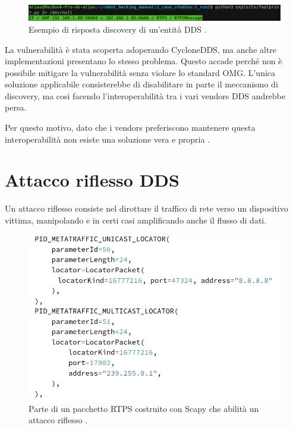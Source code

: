 \begin{figure}[H]
    \centering
    \includegraphics[width=15.2cm, keepaspectratio]{img/rispostarecoinnassance.png}
    \caption{Esempio di risposta discovery di un'entità DDS
    \cite{mayoral2022robot}.}
    \label{rispostarecoinnassance}
\end{figure}

La vulnerabilità è stata scoperta adoperando 
CycloneDDS, ma anche altre implementazioni 
presentano lo stesso problema. 
Questo accade perché non è possibile mitigare 
la vulnerabilità senza violare lo standard 
OMG. L'unica soluzione applicabile consisterebbe 
di disabilitare in parte il meccanismo di discovery, 
ma cosi facendo l'interoperabilità tra i vari vendors 
DDS andrebbe persa. 

Per questo motivo, dato che i vendors 
preferiscono mantenere questa interoperabilità non esiste 
una soluzione vera e propria \cite{mayoral2022robot}.


\section{Attacco riflesso DDS}
Un attacco riflesso consiste nel dirottare il traffico 
di rete verso un dispositivo vittima, manipolando e in certi 
casi amplificando anche il flusso di dati.

\begin{figure}[H]
    \centering
    \includegraphics[width=15.2cm, keepaspectratio]{img/submessaggereflection.png}
    \caption{Parte di un pacchetto RTPS costruito con Scapy
    che abilità un attacco
    riflesso \cite{mayoral2022robot}.}
    \label{submessaggereflection}
\end{figure}

